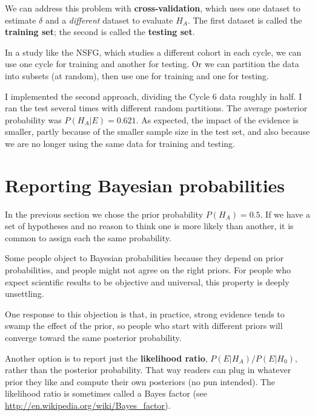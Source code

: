 \documentclass[12pt]{book}
\begin{document}
We can address this problem with {\bf cross-validation}, which uses
one dataset to estimate $\delta$ and a {\em different} dataset to
evaluate $H_A$.  The first dataset is called the {\bf training set};
the second is called the {\bf testing set}.


In a study like the NSFG, which studies a different cohort in each
cycle, we can use one cycle for training and another for testing.
Or we can partition the data into subsets (at random), then use
one for training and one for testing.


I implemented the second approach, dividing the Cycle 6 data roughly
in half.  I ran the test several times with different random partitions.
The average posterior probability was $P(H_A | E) = 0.621$.  As
expected, the impact of the evidence is smaller, partly because of
the smaller sample size in the test set, and also because we are
no longer using the same data for training and testing.



\section{Reporting Bayesian probabilities}

In the previous section we chose the prior probability $P(H_A) = 0.5$.
If we have a set of hypotheses and no reason to think one is more
likely than another, it is common to assign each the same probability.

Some people object to Bayesian probabilities because they depend on
prior probabilities, and people might not agree on
the right priors.  For people who expect scientific results to be
objective and universal, this property is deeply unsettling.


One response to this objection is that, in practice, strong evidence
tends to swamp the effect of the prior, so people who start with
different priors will converge toward the same posterior
probability.


Another option is to report just the {\bf likelihood ratio}, 
$P(E | H_A)/P(E | H_0)$, rather than the posterior probability.  That way
readers can plug in whatever prior they like and compute their own
posteriors (no pun intended).  The likelihood ratio is sometimes
called a Bayes factor (see \url{http://en.wikipedia.org/wiki/Bayes_factor}).
\end{document}

